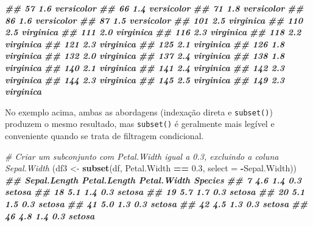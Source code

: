 \documentclass[
]{book}
\newenvironment{Shaded}{\begin{snugshade}}{\end{snugshade}}
\newcommand{\AttributeTok}[1]{\textcolor[rgb]{0.13,0.29,0.53}{#1}}
\newcommand{\CommentTok}[1]{\textcolor[rgb]{0.56,0.35,0.01}{\textit{#1}}}
\newcommand{\DocumentationTok}[1]{\textcolor[rgb]{0.56,0.35,0.01}{\textbf{\textit{#1}}}}
\newcommand{\FloatTok}[1]{\textcolor[rgb]{0.00,0.00,0.81}{#1}}
\newcommand{\FunctionTok}[1]{\textcolor[rgb]{0.13,0.29,0.53}{\textbf{#1}}}
\newcommand{\NormalTok}[1]{#1}
\newcommand{\OtherTok}[1]{\textcolor[rgb]{0.56,0.35,0.01}{#1}}
\newcommand{\SpecialCharTok}[1]{\textcolor[rgb]{0.81,0.36,0.00}{\textbf{#1}}}
\begin{document}
\begin{Shaded}
\begin{Highlighting}[]
\DocumentationTok{\#\# 57          1.6 versicolor}
\DocumentationTok{\#\# 66          1.4 versicolor}
\DocumentationTok{\#\# 71          1.8 versicolor}
\DocumentationTok{\#\# 86          1.6 versicolor}
\DocumentationTok{\#\# 87          1.5 versicolor}
\DocumentationTok{\#\# 101         2.5  virginica}
\DocumentationTok{\#\# 110         2.5  virginica}
\DocumentationTok{\#\# 111         2.0  virginica}
\DocumentationTok{\#\# 116         2.3  virginica}
\DocumentationTok{\#\# 118         2.2  virginica}
\DocumentationTok{\#\# 121         2.3  virginica}
\DocumentationTok{\#\# 125         2.1  virginica}
\DocumentationTok{\#\# 126         1.8  virginica}
\DocumentationTok{\#\# 132         2.0  virginica}
\DocumentationTok{\#\# 137         2.4  virginica}
\DocumentationTok{\#\# 138         1.8  virginica}
\DocumentationTok{\#\# 140         2.1  virginica}
\DocumentationTok{\#\# 141         2.4  virginica}
\DocumentationTok{\#\# 142         2.3  virginica}
\DocumentationTok{\#\# 144         2.3  virginica}
\DocumentationTok{\#\# 145         2.5  virginica}
\DocumentationTok{\#\# 149         2.3  virginica}
\end{Highlighting}
\end{Shaded}

No exemplo acima, ambas as abordagens (indexação direta e \texttt{subset()})
produzem o mesmo resultado, mas \texttt{subset()} é geralmente mais legível e
conveniente quando se trata de filtragem condicional.

\begin{Shaded}
\begin{Highlighting}[]
\CommentTok{\# Criar um subconjunto com Petal.Width igual a 0.3, excluindo a coluna Sepal.Width}
\NormalTok{(df3 }\OtherTok{\textless{}{-}} \FunctionTok{subset}\NormalTok{(df, Petal.Width }\SpecialCharTok{==} \FloatTok{0.3}\NormalTok{, }\AttributeTok{select =} \SpecialCharTok{{-}}\NormalTok{Sepal.Width))}
\DocumentationTok{\#\#    Sepal.Length Petal.Length Petal.Width Species}
\DocumentationTok{\#\# 7           4.6          1.4         0.3  setosa}
\DocumentationTok{\#\# 18          5.1          1.4         0.3  setosa}
\DocumentationTok{\#\# 19          5.7          1.7         0.3  setosa}
\DocumentationTok{\#\# 20          5.1          1.5         0.3  setosa}
\DocumentationTok{\#\# 41          5.0          1.3         0.3  setosa}
\DocumentationTok{\#\# 42          4.5          1.3         0.3  setosa}
\DocumentationTok{\#\# 46          4.8          1.4         0.3  setosa}
\end{Highlighting}
\end{Shaded}
\end{document}
